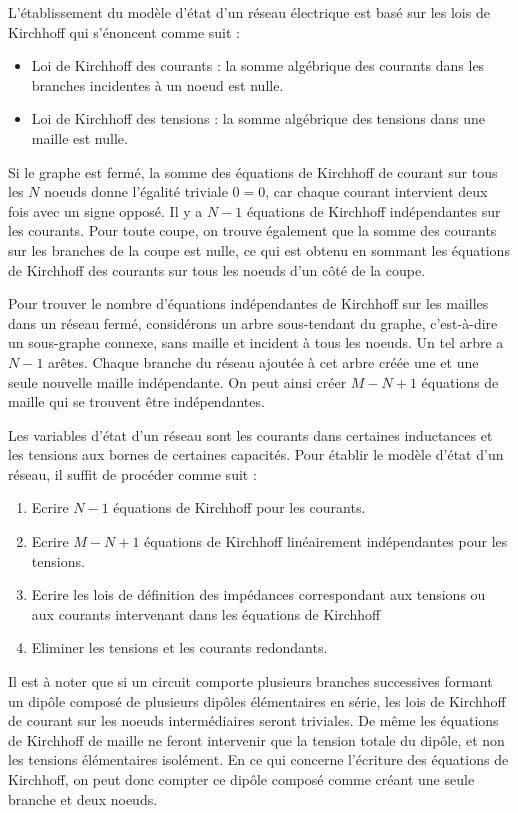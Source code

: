 L'établissement du modèle d'état d'un réseau électrique est
basé sur les lois de Kirchhoff qui s'énoncent comme suit :
\begin{itemize}
\item Loi de Kirchhoff des courants : la somme algébrique des
courants dans les branches incidentes à un noeud est nulle.
\item Loi de Kirchhoff des tensions : la somme algébrique des
tensions dans une maille est nulle.
\end{itemize}


Si le graphe est fermé, la somme des équations de Kirchhoff de courant sur tous les $N$ noeuds donne l'égalité triviale $0=0$, car chaque courant intervient deux fois avec un signe opposé. Il y a $N-1$ équations de Kirchhoff indépendantes sur les courants. Pour toute coupe, on trouve également que la somme des courants sur les branches de la coupe est nulle, ce qui est obtenu en sommant les équations de Kirchhoff des courants sur tous les noeuds d'un côté de la coupe.

Pour trouver le nombre d'équations indépendantes de Kirchhoff sur les mailles dans un réseau fermé, considérons un arbre sous-tendant du graphe, c'est-à-dire un sous-graphe connexe, sans maille et incident à tous les noeuds. Un tel arbre a $N-1$ arêtes. Chaque branche du réseau ajoutée à cet arbre  créée une et une seule nouvelle maille indépendante. On peut ainsi créer $M-N+1$ équations de maille qui se trouvent être indépendantes.


Les variables d'état d'un réseau sont les courants dans
certaines inductances et les tensions aux bornes de certaines
capacités.   Pour établir le modèle d'état d'un réseau, il suffit
de procéder comme suit :
\begin{enumerate}
\item Ecrire $N-1$ équations de Kirchhoff  pour les courants.
\item Ecrire $M-N+1$ équations de Kirchhoff linéairement
indépendan\-tes pour les tensions.
\item Ecrire les lois de définition des impédances correspondant
aux  tensions ou aux courants intervenant dans les équations de
Kirchhoff 
\item Eliminer les tensions et les courants redondants.
\end{enumerate}

Il est à noter que si un circuit comporte plusieurs branches successives formant un dipôle composé de plusieurs dipôles élémentaires en série, les lois de Kirchhoff de courant sur les noeuds intermédiaires seront triviales. De même les équations de Kirchhoff de maille ne feront intervenir que la tension totale du dipôle, et non les tensions élémentaires isolément.
En ce qui concerne l'écriture des équations de Kirchhoff, on peut donc compter ce dipôle composé comme  créant une seule branche et deux noeuds.


